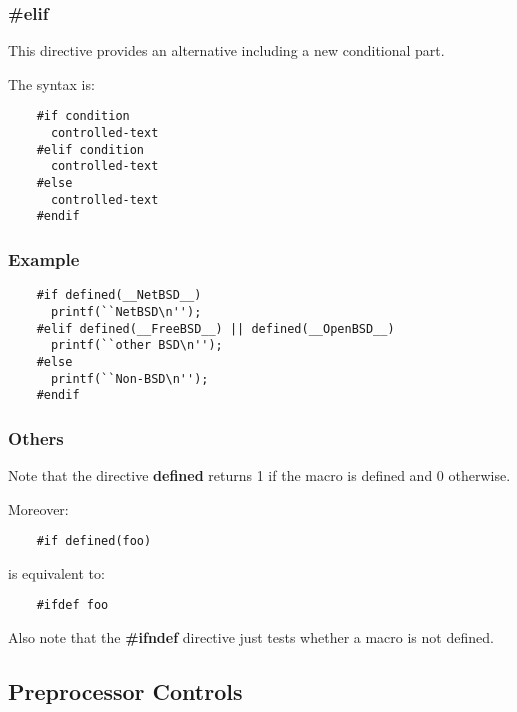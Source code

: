 \documentclass[8pt]{beamer}
\newcommand{\nl}[0]{\vspace{0.4cm}}
\begin{document}

\begin{frame}[containsverbatim]
  \frametitle{\textbf{\#elif}}

  This directive provides an alternative including a new conditional part.

  \nl

  The syntax is:

  \begin{verbatim}
    #if condition
      controlled-text
    #elif condition
      controlled-text
    #else
      controlled-text
    #endif
  \end{verbatim}
\end{frame}


\begin{frame}[containsverbatim]
  \frametitle{Example}

  \begin{verbatim}
    #if defined(__NetBSD__)
      printf(``NetBSD\n'');
    #elif defined(__FreeBSD__) || defined(__OpenBSD__)
      printf(``other BSD\n'');
    #else
      printf(``Non-BSD\n'');
    #endif
  \end{verbatim}
\end{frame}


\begin{frame}[containsverbatim]
  \frametitle{Others}

  Note that the directive \textbf{defined} returns 1 if the macro is
  defined and 0 otherwise.

  \nl

  Moreover:

  \begin{verbatim}
    #if defined(foo)
  \end{verbatim}

  is equivalent to:

  \begin{verbatim}
    #ifdef foo
  \end{verbatim}

  Also note that the \textbf{\#ifndef} directive just tests whether a macro
  is not defined.
\end{frame}

%
%

\subsection{Preprocessor Controls}
\end{document}
